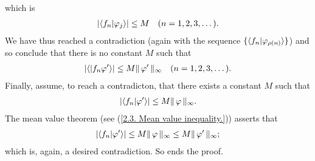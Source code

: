 %
which is %
%
  \begin{align}
    \lvert
      \langle{f_n}\lvert{\varphi_j}\rangle
    \rvert 
      \leq 
    M 
    \quad (n=1, 2, 3, \dots).
  \end{align}
%
We have thus reached a contradiction (again with the sequence %
%
  $\{\langle f_n\lvert \varphi_{\rho(n)} \rangle\}$) %
%
and so conclude that there is no constant $M$ such that %
%
  \begin{align}
    \lvert 
      \langle \lvert f_n \varphi'\rangle
    \rvert 
      \leq 
    M \| \,\varphi' \, \|_{\infty}
    \quad (n=1, 2, 3, \dots).
  \end{align}
%
Finally, assume, to reach a contradicton, that %
there exists a constant $M$ such that 
%
  \begin{align}
    \lvert \langle f_n \lvert \varphi' \rangle \rvert 
      \leq 
    M \| \,\varphi \, \|_{\infty}.
  \end{align}
%
The mean value theorem (see (\ref{2.3. Mean value inequality.})) asserts that %
%
  \begin{align}
    \lvert \langle f_n \lvert \varphi' \rangle \rvert 
      \leq 
    M \| \,\varphi \, \|_{\infty} 
      \leq 
    M \| \,\varphi' \, \|_{\infty}; 
  \end{align}
%
which is, again, a desired contradiction. So ends the proof.

